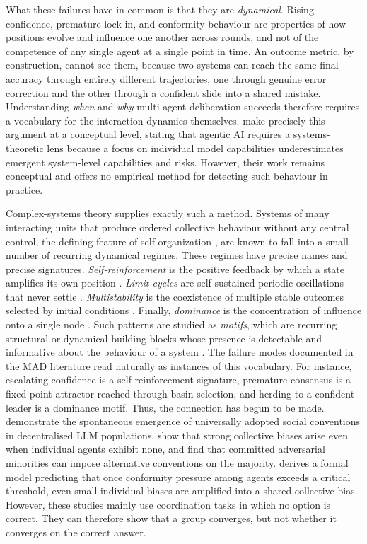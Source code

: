 What these failures have in common is that they are \emph{dynamical}. Rising
confidence, premature lock-in, and conformity behaviour are properties of how
positions evolve and influence one another across rounds, and not of the competence of any single
agent at a single point in time. An outcome metric, by
construction, cannot see them, because two systems can reach the same final accuracy
through entirely different trajectories, one through genuine error correction
and the other through a confident slide into a shared mistake. Understanding
\emph{when} and \emph{why} multi-agent deliberation succeeds therefore requires
a vocabulary for the interaction dynamics themselves. \citet{miehling2025agentic}
make precisely this argument at a conceptual level, stating that agentic \ac{AI}
requires a systems-theoretic lens because a focus on individual model capabilities
underestimates emergent system-level capabilities and risks. However, 
their work remains conceptual and offers no empirical method for
detecting such behaviour in practice.

Complex-systems theory supplies exactly such a method. Systems of many
interacting units that produce ordered collective behaviour without any central
control, the defining feature of self-organization \citep{camazine2001self},
are known to fall into a small number of recurring dynamical regimes. These
regimes have precise names and precise signatures. \emph{Self-reinforcement}
is the positive feedback by which a state amplifies its own position
\citep{arthur1989competing}. \emph{Limit cycles} are self-sustained periodic
oscillations that never settle \citep{strogatz2015nonlinear}.
\emph{Multistability} is the coexistence of multiple stable outcomes selected by
initial conditions \citep{feudel2008complex}. Finally, \emph{dominance} is the
concentration of influence onto a single node \citep{degroot1974consensus,
jia2015opinion}. Such patterns are studied as \emph{motifs}, which are recurring structural or
dynamical building blocks whose presence is detectable and informative about the behaviour of a system \citep{milo2002network, alon2007network,
driscoll2024dynamical}. The failure modes documented in the \ac{MAD} literature read
naturally as instances of this vocabulary. For instance, escalating confidence is a
self-reinforcement signature, premature consensus is a fixed-point attractor
reached through basin selection, and herding to a confident leader is a
dominance motif. Thus, the connection has begun to be made.
\citet{ashery2025conventions} demonstrate the spontaneous emergence of
universally adopted social conventions in decentralised \ac{LLM} populations, show
that strong collective biases arise even when individual agents exhibit none,
and find that committed adversarial minorities can impose alternative
conventions on the majority. \citet{okawa2026biasedconsensus} derives a formal model predicting that once
conformity pressure among agents exceeds a critical threshold, even small
individual biases are amplified into a shared collective bias.
However, these studies mainly use coordination tasks in which no option is correct.
They can therefore show that a group converges, but not whether it converges on the correct answer.

